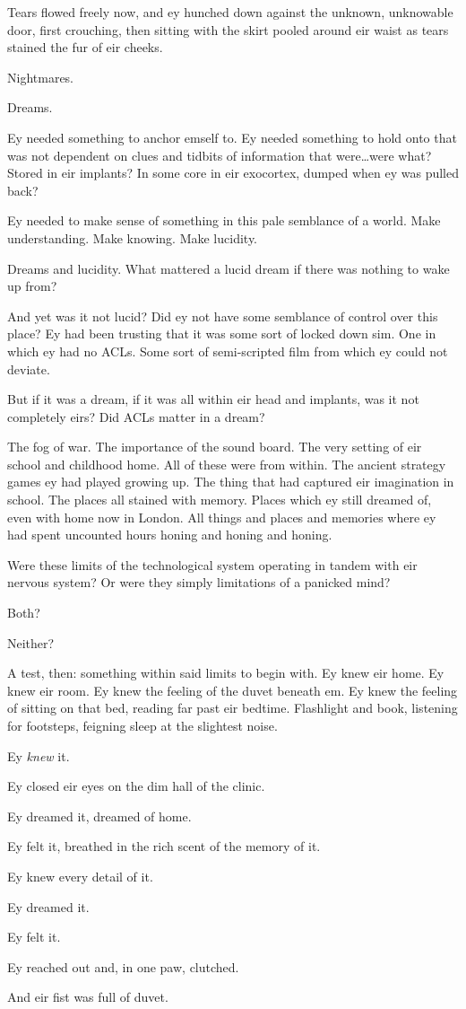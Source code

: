 Tears flowed freely now, and ey hunched down against the unknown, unknowable door, first crouching, then sitting with the skirt pooled around eir waist as tears stained the fur of eir cheeks.

Nightmares.

Dreams.

Ey needed something to anchor emself to. Ey needed something to hold onto that was not dependent on clues and tidbits of information that were\ldots{}were what? Stored in eir implants? In some core in eir exocortex, dumped when ey was pulled back?

Ey needed to make sense of something in this pale semblance of a world. Make understanding. Make knowing. Make lucidity.

Dreams and lucidity. What mattered a lucid dream if there was nothing to wake up from?

And yet was it not lucid? Did ey not have some semblance of control over this place? Ey had been trusting that it was some sort of locked down sim. One in which ey had no ACLs. Some sort of semi-scripted film from which ey could not deviate.

But if it was a dream, if it was all within eir head and implants, was it not completely eirs? Did ACLs matter in a dream?

The fog of war. The importance of the sound board. The very setting of eir school and childhood home. All of these were from within. The ancient strategy games ey had played growing up. The thing that had captured eir imagination in school. The places all stained with memory. Places which ey still dreamed of, even with home now in London. All things and places and memories where ey had spent uncounted hours honing and honing and honing.

Were these limits of the technological system operating in tandem with eir nervous system? Or were they simply limitations of a panicked mind?

Both?

Neither?

A test, then: something within said limits to begin with. Ey knew eir home. Ey knew eir room. Ey knew the feeling of the duvet beneath em. Ey knew the feeling of sitting on that bed, reading far past eir bedtime. Flashlight and book, listening for footsteps, feigning sleep at the slightest noise.

Ey \emph{knew} it.

Ey closed eir eyes on the dim hall of the clinic.

Ey dreamed it, dreamed of home.

Ey felt it, breathed in the rich scent of the memory of it.

Ey knew every detail of it.

Ey dreamed it.

Ey felt it.

Ey reached out and, in one paw, clutched.

And eir fist was full of duvet.
